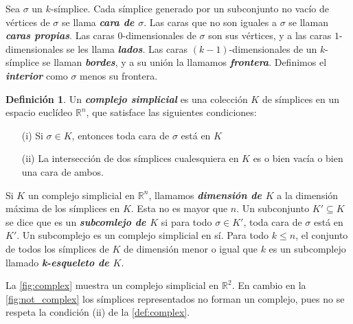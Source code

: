 \documentclass[10pt]{report}
\newcommand{\R}{\mathbb{R}}
\newcommand{\enfatiza}[1]{\textbf{\textit{#1}}}
\theoremstyle{definition}
\newtheorem{defin}{Definición}[section]
\begin{document}
Sea $\sigma$ un $k$-símplice. Cada símplice generado por un subconjunto no vacío de vértices de $\sigma$ se llama \enfatiza{cara de $\sigma$}. Las caras que no son iguales a $\sigma$ se llaman \enfatiza{caras propias}. Las caras $0$-dimensionales de $\sigma$ son sus vértices, y a las caras $1$-dimensionales se les llama \enfatiza{lados}. Las caras $(k-1)$-dimensionales de un $k$-símplice se llaman \enfatiza{bordes}, y a su unión la llamamos \enfatiza{frontera}. Definimos el \enfatiza{interior} como $\sigma$ menos su frontera. 


\begin{defin}%
Un \enfatiza{complejo simplicial} es una colección $K$ de símplices en un espacio euclídeo $\R ^n$, que satisface las siguientes condiciones:
\begin{itemize}
\item[(i)] Si $\sigma \in K $, entonces toda cara de $\sigma$ está en $K$
\item[(ii)] La intersección de dos símplices cualesquiera en $K$ es o bien vacía o bien una cara de ambos.
\end{itemize}
\label{def:complex}
\end{defin}

Si $K$ un complejo simplicial en $\R ^n$, llamamos \enfatiza{dimensión de $K$} a la dimensión máxima de los símplices en $K$. Esta no es mayor que $n$.
Un subconjunto $K'\subseteq K$ se dice que es un \enfatiza{subcomlejo de $K$} si para todo $\sigma \in K'$, toda cara de $\sigma$ está en $K'$. Un subcomplejo es un complejo simplicial en sí.
Para todo $k\leq n$, el conjunto de todos los símplices de $K$ de dimensión menor o igual que $k$ es un subcomplejo llamado \enfatiza{k-esqueleto de $K$}.

La \autoref{fig:complex} muestra un complejo simplicial en $\R^2$. En cambio en la \autoref{fig:not_complex} los símplices representados no forman un complejo, pues no se respeta la condición (ii) de la \autoref{def:complex}.
\end{document}
